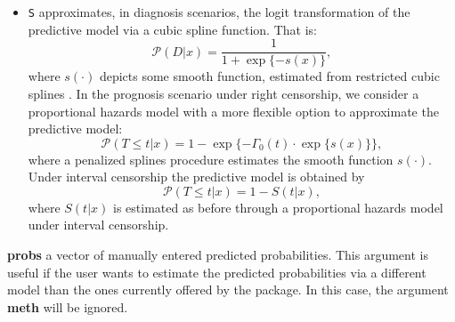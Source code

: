 \begin{itemize}
{\begin{itemize}
{In this case, the parameter {\bf{all}} indicates whether this approximation applied to all individuals or just to the mixed/censored/undefined ones.
}
\item{\texttt{S}} {approximates, in diagnosis scenarios, the logit transformation of the predictive model via a cubic spline function. That is: $${\mathcal{P}}(D | x) = \frac{1}{1 + \exp \{-s(x)\}},$$ where $s(\cdot)$ depicts some smooth function, estimated from restricted cubic splines \citep{Harrel2015}.
In the prognosis scenario under right censorship, we consider a proportional hazards model with a more flexible option to approximate the predictive model:
$${\mathcal{P}}(T \leq t | x) = 1 - \exp \{ -\Gamma_0(t) \cdot \exp \{ s(x) \}\},$$ where a penalized splines procedure \citep{Hurvich1998} estimates the smooth function $s(\cdot)$. Under interval censorship the predictive model is obtained by
$${\mathcal{P}} (T \leq t | x) = 1 - S(t|x),$$
where $S(t|x)$ is estimated as before through a proportional hazards model under interval censorship.
}
\end{itemize}
\item{\textbf{probs}} {a vector of manually entered predicted probabilities. This argument is useful if the user wants to estimate the predicted probabilities via a different model than the ones currently offered by the package. In this case, the argument {\textbf{meth}} will be ignored.}

}
\end{itemize}
